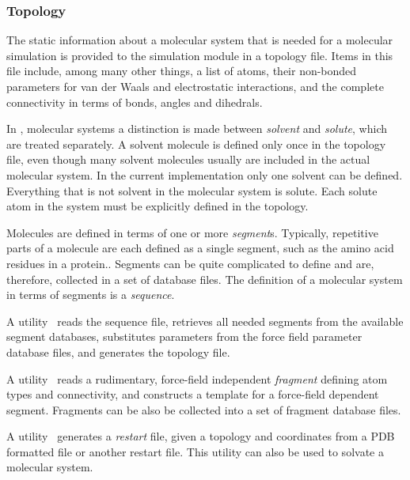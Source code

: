 \subsubsection{Topology}
\label{topology}
The static information about a molecular system that is needed for
a molecular simulation is provided to the simulation module in a
topology file. 
Items in this file include, among many other things, 
a list of atoms, their non-bonded parameters for van der Waals and
electrostatic interactions, and the complete connectivity in terms
of bonds, angles and dihedrals.
\par
In \nwargos, molecular systems a distinction is made between 
{\it solvent} and {\it solute}, which are treated separately.
A solvent molecule is defined only once in the topology file,
even though many solvent molecules usually are included in the
actual molecular system. In the current implementation only one 
solvent can be defined. Everything that is not solvent in the 
molecular system is solute. Each solute atom in the system must 
be explicitly defined in the topology. 
\par
Molecules are defined in terms of one or more {\it segment}s. 
Typically, repetitive parts of a molecule are each defined as a single
segment, such as the amino acid residues in a protein.. 
Segments  can be quite complicated to define and are, therefore, 
collected in a set of database files. 
The definition of a molecular system in terms of segments is a
{\it sequence}.
\par
A utility \nwtop\ reads the sequence file, retrieves all needed 
segments from the available segment databases, substitutes parameters
from the force field parameter database files, and generates the
topology file.
\par
A utility \nwsgm\ reads a rudimentary, force-field independent
{\it fragment} defining atom types and connectivity, and 
constructs a template for a force-field dependent segment.
Fragments can be also be collected into a set of fragment database
files.
\par
A utility \nwrst\ generates a {\it restart} file, given a topology
and coordinates from a PDB formatted file or another restart file.
This utility can also be used to solvate a molecular system.
